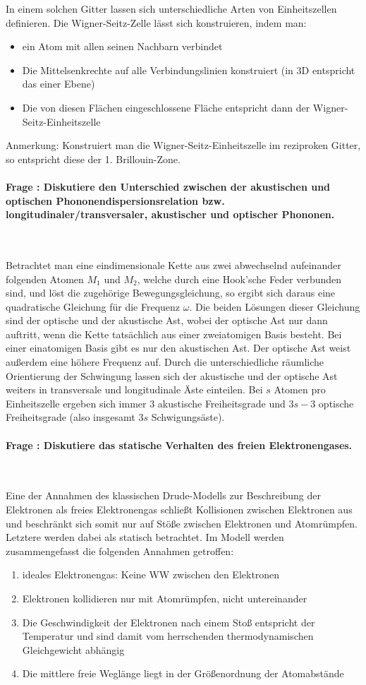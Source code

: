 \documentclass[a4paper, 11pt, ngerman, parskip=half-]{scrartcl}
\newcounter{question}
\newcommand{\question}[1]{\stepcounter{question}\paragraph{Frage \thequestion: #1}~}
\begin{document}
In einem solchen Gitter lassen sich unterschiedliche Arten von Einheitszellen definieren. Die Wigner-Seitz-Zelle lässt sich konstruieren, indem man:
\begin{itemize}
    \item ein Atom mit allen seinen Nachbarn verbindet
    \item Die Mittelsenkrechte auf alle Verbindungslinien konstruiert (in 3D entspricht das einer Ebene)
    \item Die von diesen Flächen eingeschlossene Fläche entspricht dann der Wigner-Seitz-Einheitszelle
\end{itemize}
Anmerkung: Konstruiert man die Wigner-Seitz-Einheitszelle im reziproken Gitter, so entspricht diese der 1. Brillouin-Zone.

\question{Diskutiere den Unterschied zwischen der akustischen und optischen Phononendispersionsrelation bzw. longitudinaler/transversaler, akustischer und optischer Phononen.}
\label{q:55}

Betrachtet man eine eindimensionale Kette aus zwei abwechselnd aufeinander folgenden Atomen $M_1$ und $M_2$, welche durch eine Hook'sche Feder verbunden sind, und löst die zugehörige Bewegungsgleichung, so ergibt sich daraus eine quadratische Gleichung für die Frequenz $\omega$. Die beiden Lösungen dieser Gleichung sind der optische und der akustische Ast, wobei der optische Ast nur dann auftritt, wenn die Kette tatsächlich aus einer zweiatomigen Basis besteht. Bei einer einatomigen Basis gibt es nur den akustischen Ast. Der optische Ast weist außerdem eine höhere Frequenz auf. Durch die unterschiedliche räumliche Orientierung der Schwingung lassen sich der akustische und der optische Ast weiters in transversale und longitudinale Äste einteilen. Bei $s$ Atomen pro Einheitszelle ergeben sich immer $3$ akustische Freiheitsgrade und $3s-3$ optische Freiheitsgrade (also insgesamt $3s$ Schwigungsäste).

\question{Diskutiere das statische Verhalten des freien Elektronengases.}
\label{q:56}

Eine der Annahmen des klassischen Drude-Modells zur Beschreibung der Elektronen als freies Elektronengas schließt Kollisionen zwischen Elektronen aus und beschränkt sich somit nur auf Stöße zwischen Elektronen und Atomrümpfen. Letztere werden dabei als statisch betrachtet. Im Modell werden zusammengefasst die folgenden Annahmen getroffen:

\begin{enumerate}
    \item ideales Elektronengas: Keine WW zwischen den Elektronen
    \item Elektronen kollidieren nur mit Atomrümpfen, nicht untereinander
    \item Die Geschwindigkeit der Elektronen nach einem Stoß entspricht der Temperatur und sind damit vom herrschenden thermodynamischen Gleichgewicht abhängig
    \item Die mittlere freie Weglänge liegt in der Größenordnung der Atomabstände
\end{enumerate}
\end{document}
